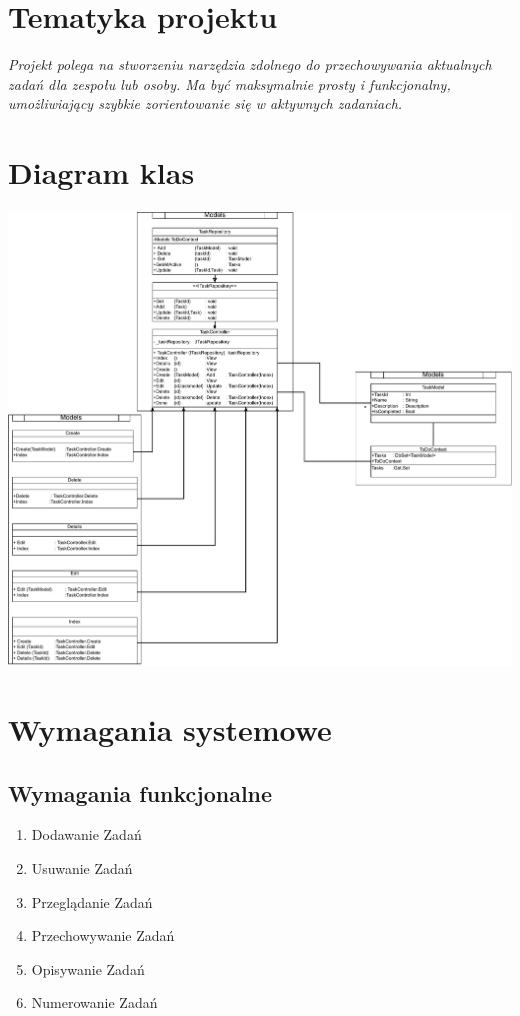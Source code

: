 \documentclass{article}
\begin{document}
\makeheader

\section{Tematyka projektu}
{\small\it Projekt polega na stworzeniu narzędzia zdolnego do przechowywania aktualnych zadań dla zespołu lub osoby. Ma być maksymalnie prosty i funkcjonalny, umożliwiający szybkie zorientowanie się w aktywnych zadaniach.}

\section{Diagram klas}
\includegraphics[scale=0.50] {diagram.pdf}

\section{Wymagania systemowe}
\subsection{Wymagania funkcjonalne}
\begin{enumerate}
    \item Dodawanie Zadań
    \item Usuwanie Zadań
    \item Przeglądanie Zadań
    \item Przechowywanie Zadań
    \item Opisywanie Zadań
    \item Numerowanie Zadań
\end{enumerate}
\end{document}
